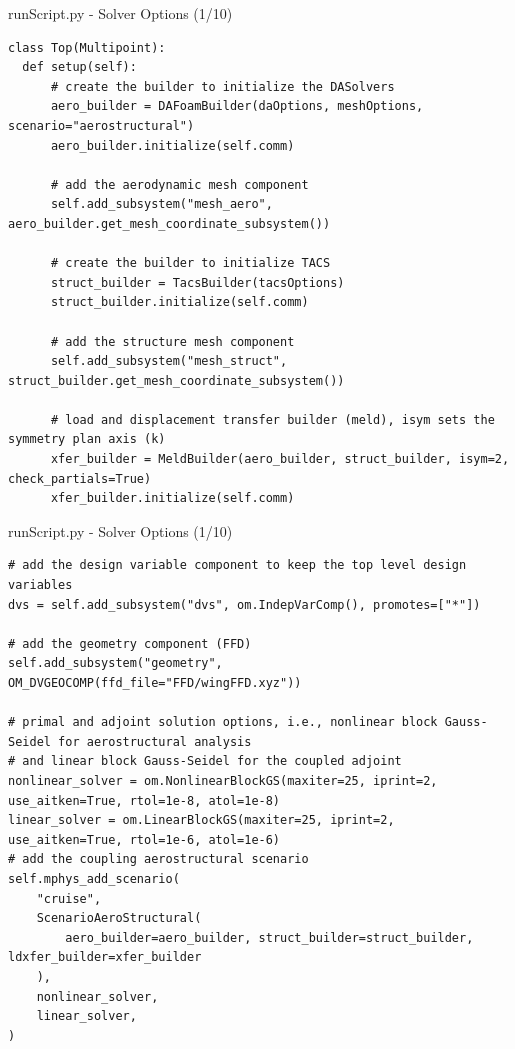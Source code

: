 \documentclass{bredelebeamer}
\begin{document}
\begin{frame}[fragile]{runScript.py - Solver Options (1/10)}
\scriptsize
\lstset{ language=bash }
\begin{lstlisting}
class Top(Multipoint):
  def setup(self):
      # create the builder to initialize the DASolvers
      aero_builder = DAFoamBuilder(daOptions, meshOptions, scenario="aerostructural")
      aero_builder.initialize(self.comm)

      # add the aerodynamic mesh component
      self.add_subsystem("mesh_aero", aero_builder.get_mesh_coordinate_subsystem())

      # create the builder to initialize TACS
      struct_builder = TacsBuilder(tacsOptions)
      struct_builder.initialize(self.comm)

      # add the structure mesh component
      self.add_subsystem("mesh_struct", struct_builder.get_mesh_coordinate_subsystem())

      # load and displacement transfer builder (meld), isym sets the symmetry plan axis (k)
      xfer_builder = MeldBuilder(aero_builder, struct_builder, isym=2, check_partials=True)
      xfer_builder.initialize(self.comm)
\end{lstlisting}
\normalsize
\end{frame}

\begin{frame}[fragile]{runScript.py - Solver Options (1/10)}
\scriptsize
\lstset{ language=bash }
\begin{lstlisting}
# add the design variable component to keep the top level design variables
dvs = self.add_subsystem("dvs", om.IndepVarComp(), promotes=["*"])

# add the geometry component (FFD)
self.add_subsystem("geometry", OM_DVGEOCOMP(ffd_file="FFD/wingFFD.xyz"))

# primal and adjoint solution options, i.e., nonlinear block Gauss-Seidel for aerostructural analysis
# and linear block Gauss-Seidel for the coupled adjoint
nonlinear_solver = om.NonlinearBlockGS(maxiter=25, iprint=2, use_aitken=True, rtol=1e-8, atol=1e-8)
linear_solver = om.LinearBlockGS(maxiter=25, iprint=2, use_aitken=True, rtol=1e-6, atol=1e-6)
# add the coupling aerostructural scenario
self.mphys_add_scenario(
    "cruise",
    ScenarioAeroStructural(
        aero_builder=aero_builder, struct_builder=struct_builder, ldxfer_builder=xfer_builder
    ),
    nonlinear_solver,
    linear_solver,
)
\end{lstlisting}
\normalsize
\end{frame}
\end{document}
